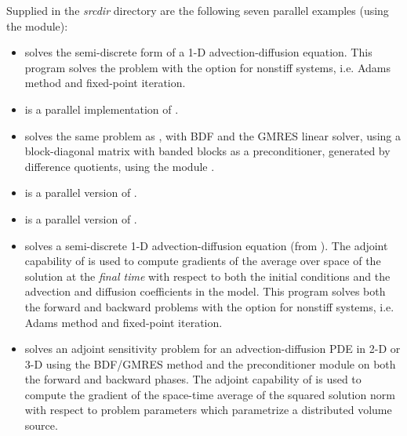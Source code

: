 
\vspace{0.2in}\noindent 
Supplied in the {\em srcdir} directory are
the following seven parallel examples (using the {\nvecp} module):

\begin{itemize}


\item {}
  solves the semi-discrete form of a 1-D advection-diffusion equation.
  \newline
  This program solves the problem with the option for nonstiff systems,
  i.e. Adams method and fixed-point iteration.
\item {}
  is a parallel implementation of .
\item {}
  solves the same problem as , with BDF and the GMRES linear
  solver, using a block-diagonal matrix with banded blocks as a preconditioner, 
  generated by difference quotients, using the module {\cvbbdpre}.


\item {}
  is a parallel version of .
\item {}
  is a parallel version of .

\item {}
  solves a semi-discrete 1-D advection-diffusion equation (from ).
  \newline
  The adjoint capability of {\cvodes} is used to compute gradients
  of the average over space of the solution at the {\em final time} with
  respect to both the initial conditions and the advection and
  diffusion coefficients in the model.
  This program solves both the forward and backward problems with the option 
  for nonstiff systems, i.e. Adams method and fixed-point iteration.
\item {}
  solves an adjoint sensitivity problem for an advection-diffusion PDE in 2-D 
  or 3-D using the BDF/GMRES method and the {\cvbbdpre} preconditioner module
  on both the forward and backward phases.
  \newline
  The adjoint capability of {\cvodes} is used to compute the gradient of the
  space-time average of the squared solution norm with respect to problem 
  parameters which parametrize a distributed volume source.

\end{itemize}

